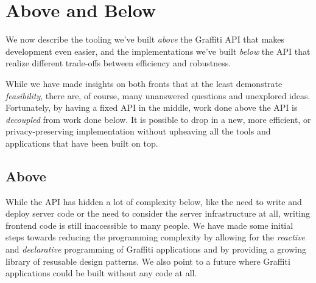\section{Above and Below}
\label{above-and-below}

We now describe the tooling we've built \emph{above}
the Graffiti API that makes development even easier, and
the implementations we've built \emph{below} the API
that realize different trade-offs between efficiency and
robustness.

While we have made insights on both fronts that at
the least demonstrate \emph{feasibility},
there are, of course,
many unanswered questions and unexplored ideas.
Fortunately, by having a fixed API in the middle, work done above the API
is \emph{decoupled} from work done below.
It is possible to drop in a new, more efficient, or privacy-preserving implementation
without upheaving all the tools and applications that have been built on top.


\subsection{Above}

While the API has hidden a lot of complexity below,
like the need to write and deploy server code or the need to
consider the server infrastructure at all,
writing frontend code is still inaccessible
to many people.
We have made some initial steps towards reducing the
programming complexity by allowing for the \emph{reactive} and
\emph{declarative} programming of Graffiti applications
and by providing a growing library of resusable design patterns.
We also point to a future where Graffiti applications could be built
without any code at all.

